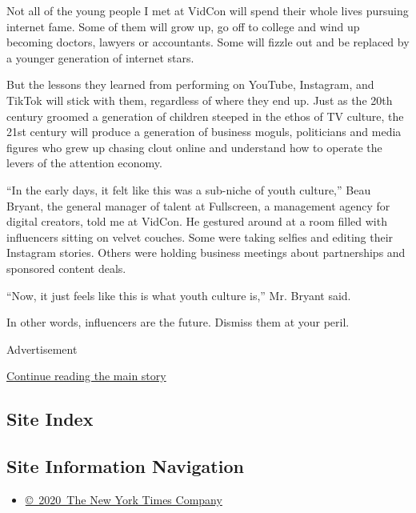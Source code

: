 Not all of the young people I met at VidCon will spend their whole lives
pursuing internet fame. Some of them will grow up, go off to college and
wind up becoming doctors, lawyers or accountants. Some will fizzle out
and be replaced by a younger generation of internet stars.

But the lessons they learned from performing on YouTube, Instagram, and
TikTok will stick with them, regardless of where they end up. Just as
the 20th century groomed a generation of children steeped in the ethos
of TV culture, the 21st century will produce a generation of business
moguls, politicians and media figures who grew up chasing clout online
and understand how to operate the levers of the attention economy.

``In the early days, it felt like this was a sub-niche of youth
culture,'' Beau Bryant, the general manager of talent at Fullscreen, a
management agency for digital creators, told me at VidCon. He gestured
around at a room filled with influencers sitting on velvet couches. Some
were taking selfies and editing their Instagram stories. Others were
holding business meetings about partnerships and sponsored content
deals.

``Now, it just feels like this is what youth culture is,'' Mr. Bryant
said.

In other words, influencers are the future. Dismiss them at your peril.

Advertisement

\protect\hyperlink{after-bottom}{Continue reading the main story}

\hypertarget{site-index}{%
\subsection{Site Index}\label{site-index}}

\hypertarget{site-information-navigation}{%
\subsection{Site Information
Navigation}\label{site-information-navigation}}

\begin{itemize}
\tightlist
\item
  \href{https://help.nytimes.com/hc/en-us/articles/115014792127-Copyright-notice}{©~2020~The
  New York Times Company}
\end{itemize}


